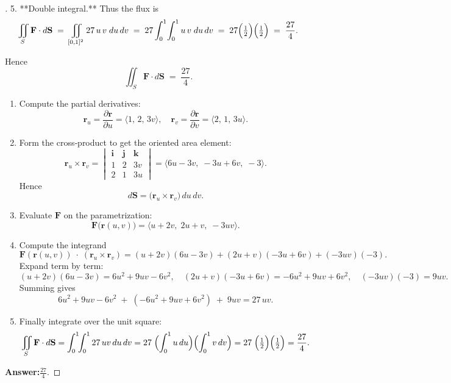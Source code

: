 \documentclass[11pt,openany]{article}
\begin{document}
\begin{proof}[\sol]
5. **Double integral.**  
Thus the flux is
\[
\iint_{S}\mathbf F\cdot d\mathbf S
\;=\;
\iint_{[0,1]^2}27\,u\,v\;du\,dv
\;=\;
27\int_0^1\!\int_0^1 u\,v\;du\,dv
\;=\;
27\Bigl(\tfrac12\Bigr)\Bigl(\tfrac12\Bigr)
\;=\;\frac{27}{4}.
\]

Hence  
\[
\boxed{\iint_{S}\mathbf F\cdot d\mathbf S \;=\;\frac{27}{4}}.
\]

\newpage
\begin{enumerate}
	\item Compute the partial derivatives:
	\[
	\mathbf{r}_u = \frac{\partial\mathbf{r}}{\partial u}
	= \langle 1,\,2,\,3v\rangle,
	\quad
	\mathbf{r}_v = \frac{\partial\mathbf{r}}{\partial v}
	= \langle 2,\,1,\,3u\rangle.
	\]
	\item Form the cross‑product to get the oriented area element:
	\[
	\mathbf{r}_u\times\mathbf{r}_v
	= 
	\begin{vmatrix}
		\mathbf{i} & \mathbf{j} & \mathbf{k} \\
		1 & 2 & 3v \\
		2 & 1 & 3u
	\end{vmatrix}
	= \bigl\langle 6u - 3v,\; -3u + 6v,\; -3 \bigr\rangle.
	\]
	Hence
	\[
	d\mathbf{S}
	= \bigl(\mathbf{r}_u \times \mathbf{r}_v\bigr)\,du\,dv.
	\]
	\item Evaluate \(\mathbf{F}\) on the parametrization:
	\[
	\mathbf{F}\bigl(\mathbf{r}(u,v)\bigr)
	= \bigl\langle u+2v,\;2u+v,\;-3uv \bigr\rangle.
	\]
	\item Compute the integrand
	\[
	\mathbf{F}(\mathbf{r}(u,v))\;\cdot\;(\mathbf{r}_u\times\mathbf{r}_v)
	= (u+2v)(6u-3v) + (2u+v)(-3u+6v) + (-3uv)(-3).
	\]
	Expand term by term:
	\[
	(u+2v)(6u-3v) = 6u^2 +9uv -6v^2,
	\quad
	(2u+v)(-3u+6v) = -6u^2 +9uv +6v^2,
	\quad
	(-3uv)(-3) = 9uv.
	\]
	Summing gives
	\[
	6u^2+9uv-6v^2 \;+\;(-6u^2+9uv+6v^2)\;+\;9uv
	= 27\,u v.
	\]
	\item Finally integrate over the unit square:
	\[
	\iint_{S}\mathbf{F}\cdot d\mathbf{S}
	= \int_{0}^{1}\!\!\int_{0}^{1} 27\,u v \,du\,dv
	= 27\;\Bigl(\int_{0}^{1}u\,du\Bigr)\Bigl(\int_{0}^{1}v\,dv\Bigr)
	= 27\;\Bigl(\tfrac12\Bigr)\Bigl(\tfrac12\Bigr)
	= \frac{27}{4}.
	\]
\end{enumerate}

\medskip
\noindent\textbf{Answer:}\quad \(\displaystyle \frac{27}{4}.\)
\end{proof}

\end{document}
